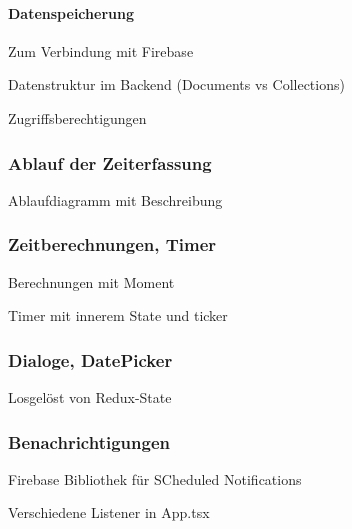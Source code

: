 \paragraph{Datenspeicherung}
Zum 
Verbindung mit Firebase

Datenstruktur im Backend (Documents vs Collections)

Zugriffsberechtigungen




\subsubsection{Ablauf der Zeiterfassung}
Ablaufdiagramm mit Beschreibung

\subsubsection{Zeitberechnungen, Timer}
Berechnungen mit Moment

Timer mit innerem State und ticker

\subsubsection{Dialoge, DatePicker}
Losgelöst von Redux-State

\subsubsection{Benachrichtigungen}
Firebase Bibliothek für SCheduled Notifications

Verschiedene Listener in App.tsx

